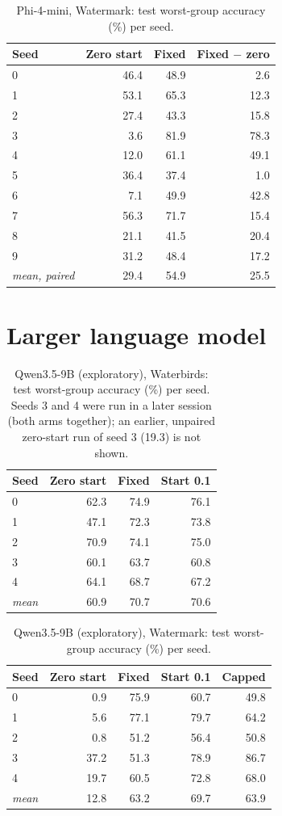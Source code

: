 \documentclass[10pt]{article}
\begin{document}
\begin{longtable}{lrrr}
\caption{Phi-4-mini, Watermark: test worst-group accuracy (\%) per seed.}\label{tab:s-phi-water}\\
\toprule
Seed & Zero start & Fixed & Fixed $-$ zero \\ \midrule
\endhead
0 & 46.4 & 48.9 & 2.6 \\
1 & 53.1 & 65.3 & 12.3 \\
2 & 27.4 & 43.3 & 15.8 \\
3 & 3.6 & 81.9 & 78.3 \\
4 & 12.0 & 61.1 & 49.1 \\
5 & 36.4 & 37.4 & 1.0 \\
6 & 7.1 & 49.9 & 42.8 \\
7 & 56.3 & 71.7 & 15.4 \\
8 & 21.1 & 41.5 & 20.4 \\
9 & 31.2 & 48.4 & 17.2 \\
\textit{mean, paired} & 29.4 & 54.9 & 25.5 \\
\bottomrule
\end{longtable}

\section{Larger language model}
\begin{longtable}{lrrr}
\caption{Qwen3.5-9B (exploratory), Waterbirds: test worst-group accuracy (\%) per seed. Seeds 3 and 4 were run in a later session (both arms together); an earlier, unpaired zero-start run of seed 3 (19.3) is not shown.}\label{tab:s-9b-water}\\
\toprule
Seed & Zero start & Fixed & Start 0.1 \\ \midrule
\endhead
0 & 62.3 & 74.9 & 76.1 \\
1 & 47.1 & 72.3 & 73.8 \\
2 & 70.9 & 74.1 & 75.0 \\
3 & 60.1 & 63.7 & 60.8 \\
4 & 64.1 & 68.7 & 67.2 \\
\textit{mean} & 60.9 & 70.7 & 70.6 \\
\bottomrule
\end{longtable}

\begin{longtable}{lrrrr}
\caption{Qwen3.5-9B (exploratory), Watermark: test worst-group accuracy (\%) per seed.}\label{tab:s-9b-water}\\
\toprule
Seed & Zero start & Fixed & Start 0.1 & Capped \\ \midrule
\endhead
0 & 0.9 & 75.9 & 60.7 & 49.8 \\
1 & 5.6 & 77.1 & 79.7 & 64.2 \\
2 & 0.8 & 51.2 & 56.4 & 50.8 \\
3 & 37.2 & 51.3 & 78.9 & 86.7 \\
4 & 19.7 & 60.5 & 72.8 & 68.0 \\
\textit{mean} & 12.8 & 63.2 & 69.7 & 63.9 \\
\bottomrule
\end{longtable}
\end{document}
